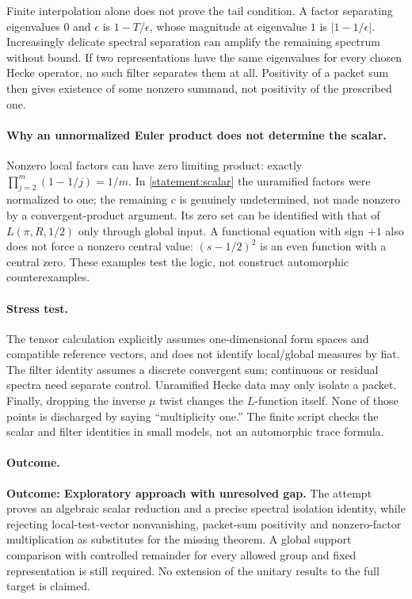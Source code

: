 \documentclass[11pt,a4paper]{article}
\numberwithin{equation}{section}
\begin{document}
Finite interpolation alone does not prove the tail condition. A factor
separating eigenvalues $0$ and $\epsilon$ is $1-T/\epsilon$, whose magnitude
at eigenvalue $1$ is $|1-1/\epsilon|$. Increasingly delicate spectral
separation can amplify the remaining spectrum without bound. If two
representations have the same eigenvalues for every chosen Hecke operator,
no such filter separates them at all. Positivity of a packet sum then gives
existence of some nonzero summand, not positivity of the prescribed one.

\paragraph{Why an unnormalized Euler product does not determine the scalar.}
Nonzero local factors can have zero limiting product: exactly
$\prod_{j=2}^m(1-1/j)=1/m$. In \eqref{statement:scalar} the unramified factors
were normalized to one; the remaining $c$ is genuinely undetermined, not
made nonzero by a convergent-product argument. Its zero set can be identified
with that of $L(\pi,R,1/2)$ only through global input. A functional equation
with sign $+1$ also does not force a nonzero central value: $(s-1/2)^2$ is an
even function with a central zero. These examples test the logic, not
construct automorphic counterexamples.

\paragraph{Stress test.}
The tensor calculation explicitly assumes one-dimensional form spaces and
compatible reference vectors, and does not identify local/global measures
by fiat. The filter identity assumes a discrete convergent sum; continuous
or residual spectra need separate control. Unramified Hecke data may only
isolate a packet. Finally, dropping the inverse $\mu$ twist changes the
$L$-function itself. None of those points is discharged by saying
``multiplicity one.'' The finite script checks the scalar and filter
identities in small models, not an automorphic trace formula.

\paragraph{Outcome.}
\textbf{Outcome: Exploratory approach with unresolved gap.}
The attempt proves an algebraic scalar reduction and a precise spectral
isolation identity, while rejecting local-test-vector nonvanishing,
packet-sum positivity and nonzero-factor multiplication as substitutes for
the missing theorem. A global support comparison with controlled remainder
for every allowed group and fixed representation is still required. No
extension of the unitary results to the full target is claimed.
\end{document}
